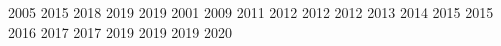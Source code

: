   2005 2015 2018 2019 2019 2001 2009 2011 2012 2012 2012 2013 2014 2015 2015
  2016 2017 2017 2019 2019 2019 2020

